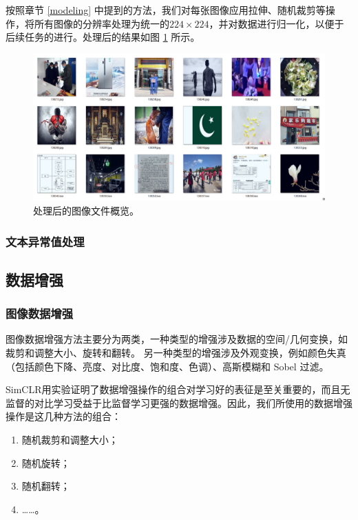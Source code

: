 \documentclass[a4paper]{zreport}
\begin{document}
按照章节 \ref{modeling} 中提到的方法，我们对每张图像应用拉伸、随机裁剪等操作，将所有图像的分辨率处理为统一的$224 \times 224$，并对数据进行归一化，以便于后续任务的进行。处理后的结果如图 \ref{fig:cleanimage} 所示。

\begin{figure}[h]
\centering
\includegraphics[width=0.95\linewidth]{figures/clean_image}
\caption{处理后的图像文件概览。}
\label{fig:cleanimage}
\end{figure}

\subsubsection{文本异常值处理}

\subsection{数据增强}


\subsubsection{图像数据增强}
图像数据增强方法主要分为两类，一种类型的增强涉及数据的空间/几何变换，如裁剪和调整大小、旋转和翻转。 另一种类型的增强涉及外观变换，例如颜色失真（包括颜色下降、亮度、对比度、饱和度、色调）、高斯模糊和 Sobel 过滤。

SimCLR用实验证明了数据增强操作的组合对学习好的表征是至关重要的，而且无监督的对比学习受益于比监督学习更强的数据增强。因此，我们所使用的数据增强操作是这几种方法的组合：
\begin{enumerate}
\item 随机裁剪和调整大小；
\item 随机旋转；
\item 随机翻转；
\item ……。
\end{enumerate}
\end{document}
